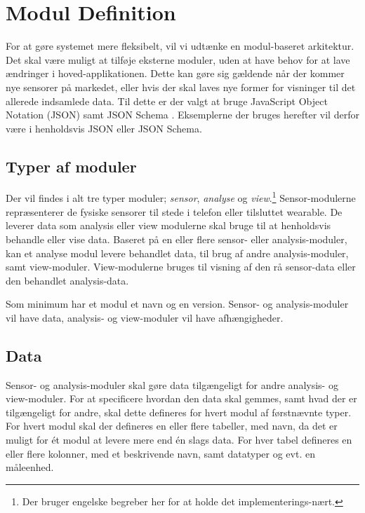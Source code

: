 \section{Modul Definition}


For at gøre systemet mere fleksibelt, vil vi udtænke en modul-baseret arkitektur.
Det skal være muligt at tilføje eksterne moduler, uden at have behov for at lave ændringer i hoved-applikationen.
Dette kan gøre sig gældende når der kommer nye sensorer på markedet, eller hvis der skal laves nye former for visninger til det allerede indsamlede data.
Til dette er der valgt at bruge JavaScript Object Notation (JSON) samt JSON Schema \cite{json_schema}.
Eksemplerne der bruges herefter vil derfor være i henholdsvis JSON eller JSON Schema.

\subsection{Typer af moduler}
Der vil findes i alt tre typer moduler; \textit{sensor}, \textit{analyse} og \textit{view}.\footnote{Der bruger engelske begreber her for at holde det implementerings-nært.}
Sensor-modulerne repræsenterer de fysiske sensorer til stede i telefon eller tilsluttet wearable.
De leverer data som analysis eller view modulerne skal bruge til at henholdsvis behandle eller vise data.
Baseret på en eller flere sensor- eller analysis-moduler, kan et analyse modul levere behandlet data, til brug af andre analysis-moduler, samt view-moduler.
View-modulerne bruges til visning af den rå sensor-data eller den behandlet analysis-data.

Som minimum har et modul et navn og en version.
Sensor- og analysis-moduler vil have data, analysis- og view-moduler vil have afhængigheder.

\subsection{Data}
Sensor- og analysis-moduler skal gøre data tilgængeligt for andre analysis- og view-moduler.
For at specificere hvordan den data skal gemmes, samt hvad der er tilgængeligt for andre, skal dette defineres for hvert modul af førstnævnte typer.
For hvert modul skal der defineres en eller flere tabeller, med navn, da det er muligt for ét modul at levere mere end én slags data.
For hver tabel defineres en eller flere kolonner, med et beskrivende navn, samt datatyper og evt. en måleenhed.

